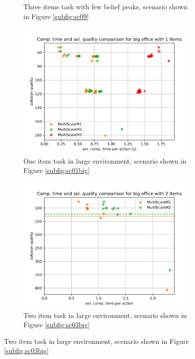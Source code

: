 \begin{figure}
\begin{subfigure}[b]{0.49\textwidth}
        \caption{Three items task with few belief peaks, scenario shown in Figure \ref{subfig:sc09}}
        \label{subfig:comp_sc09}
    \end{subfigure}
        \hfill
    \begin{subfigure}[b]{0.49\textwidth}
        \includegraphics[width=\textwidth]{Report/images/comp_time_vs_sol_quality/envbig_sc01_noavr_scatter_comptimes_vs_solqual.png}
        \caption{One item task in large environment, scenario shown in Figure \ref{subfig:sc01big}}
        \label{subfig:comp_sc01Big}
    \end{subfigure}
    \hfill
    \begin{subfigure}[b]{0.49\textwidth}
         \includegraphics[width=\textwidth]{Report/images/comp_time_vs_sol_quality/envbig_sc03_scatter_comptimes_vs_solqual.png}
        \caption{Two item task in large environment, scenario shown in Figure \ref{subfig:sc03big}}
        \label{subfig:comp_sc03Big}
    \end{subfigure}
    

\end{figure}

